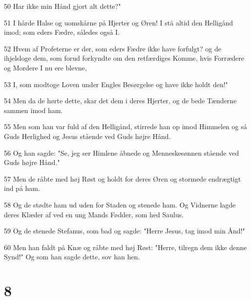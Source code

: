 \par 50 Har ikke min Hånd gjort alt dette?"
\par 51 I hårde Halse og uomskårne på Hjerter og Øren! I stå altid den Helligånd imod; som eders Fædre, således også I.
\par 52 Hvem af Profeterne er der, som eders Fædre ikke have forfulgt? og de ihjelsloge dem, som forud forkyndte om den retfærdiges Komme, hvis Forrædere og Mordere I nu ere blevne,
\par 53 I, som modtoge Loven under Engles Besørgelse og have ikke holdt den!"
\par 54 Men da de hørte dette, skar det dem i deres Hjerter, og de bede Tænderne sammen imod ham.
\par 55 Men som han var fuld af den Helligånd, stirrede han op imod Himmelen og så Guds Herlighed og Jesus stående ved Guds højre Hånd.
\par 56 Og han sagde: "Se, jeg ser Himlene åbnede og Menneskesønnen stående ved Guds højre Hånd."
\par 57 Men de råbte med høj Røst og holdt for deres Øren og stormede endrægtigt ind på ham.
\par 58 Og de stødte ham ud uden for Staden og stenede ham. Og Vidnerne lagde deres Klæder af ved en ung Mands Fødder, som hed Saulus.
\par 59 Og de stenede Stefanus, som bad og sagde: "Herre Jesus, tag imod min Ånd!"
\par 60 Men han faldt på Knæ og råbte med høj Røst: "Herre, tilregn dem ikke denne Synd!" Og som han sagde dette, sov han hen.

\chapter{8}

